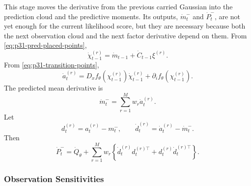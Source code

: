 \documentclass[11pt]{article}
\numberwithin{equation}{section}
\begin{document}
This stage moves the derivative from the previous carried Gaussian into the
prediction cloud and the predictive moments.  Its outputs, \(\dot m_t^-\) and
\(\dot P_t^-\), are not yet enough for the current likelihood score, but they are
necessary because both the next observation cloud and the next factor derivative
depend on them.  From \eqref{eq:p31-pred-placed-points},
\begin{equation}
  \dot\chi_{t-1}^{(r)}
  =
  \dot m_{t-1}+\dot C_{t-1}\xi^{(r)}.
  \label{eq:p31-dot-pred-place}
\end{equation}
From \eqref{eq:p31-transition-points},
\begin{equation}
  \dot a_t^{(r)}
  =
  D_xf_\theta(\chi_{t-1}^{(r)})\dot\chi_{t-1}^{(r)}
  +\partial_i f_\theta(\chi_{t-1}^{(r)}).
  \label{eq:p31-dot-transition}
\end{equation}
The predicted mean derivative is
\begin{equation}
  \dot m_t^-=\sum_{r=1}^M w_r\dot a_t^{(r)}.
  \label{eq:p31-dot-pred-mean}
\end{equation}
Let
\begin{equation}
  d_t^{(r)}=a_t^{(r)}-m_t^-,
  \qquad
  \dot d_t^{(r)}=\dot a_t^{(r)}-\dot m_t^-.
  \label{eq:p31-pred-centered}
\end{equation}
Then
\begin{equation}
  \dot P_t^-
  =
  \dot Q_\theta
  +
  \sum_{r=1}^M w_r
  \left\{
  \dot d_t^{(r)}d_t^{(r)\top}
  +d_t^{(r)}\dot d_t^{(r)\top}
  \right\}.
  \label{eq:p31-dot-pred-cov}
\end{equation}

\subsubsection{Observation Sensitivities}
\end{document}
